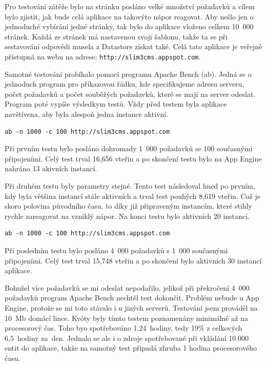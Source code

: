 Pro testování zátěže bylo na stránku posláno velké množství požadavků a cílem bylo zjistit, jak bude celá aplikace na takovýto nápor reagovat. Aby nešlo jen o jednoduché vybírání jedné stránky, tak bylo do aplikace vloženo celkem 10~000 stránek. Každá ze stránek má nastavenou svoji šablonu, takže ta se při sestavování odpovědi musela z Datastore získat také. Celá tato aplikace je veřejně přístupná na webu na adrese: \verb|http://slim3cms.appspot.com|.


Samotné testování probíhalo pomocí programu Apache Bench (ab). Jedná se o jednoduch program pro příkazovou řádku, kde specifikujeme adresu serveru, počet požadavků a počet souběžých požadavků, které se mají na server odeslat. Program poté vypíše výsledkym testů. Vždy před testem byla aplikace navštívena, aby byla alespoň jedna instance aktivní.

\begin{lstlisting}[caption={Testování 1000 požadavků se 100 souběžnými spojeními},label=lst:testOne,belowcaptionskip=0.4cm]
ab -n 1000 -c 100 http://slim3cms.appspot.com
\end{lstlisting}

Při prvním testu bylo posláno dohromady 1~000 požadavků se 100 současnými připojeními. Celý test trval 16,656 vteřin a po skončení testu bylo na App Engine nahráno 13 akivních instancí.

Při druhém testu byly parametry stejné. Tento test následoval hned po prvním, kdy byla většina instancí stále aktivních a trval test pouhých 8,619 vteřin. Což je skoro polovina původního času, to díky již připraveným instancím, které stihly rychle zareagovat na vzniklý nápor. Na konci testu bylo aktivních 20 instancí.

\begin{lstlisting}[caption={Testování 4000 požadavků s 1000 souběžnými spojeními},label=lst:testThree,belowcaptionskip=0.4cm]
ab -n 1000 -c 100 http://slim3cms.appspot.com
\end{lstlisting}

Při posledním testu bylo posláno 4~000 požadavků s 1~000 současnými připojeními. Celý test trval 15,748 vteřin a po skončení bylo aktivních 30 instancí aplikace.

Bohužel více požadavků se mi odeslat nepodařilo, jelikož při překročení 4~000 požadavků program Apache Bench nechtěl test dokončit. Problém nebude u App Engine, protože se mi toto stávalo i u jiných serverů. Testování jsem prováděl na 10~Mb domácí lince. Kvóty byly tímto testem poznamenány minimálně až na procesorový čas. Toho byo spotřebováno 1,24~hodiny, tedy 19\% z celkových 6,5~hodiny za~den. Jednalo se ale i o zdroje spotřebované při vkládání 10.000 entit do aplikace, takže na samotný test připadá zhruba 1 hodina procesorového času.

